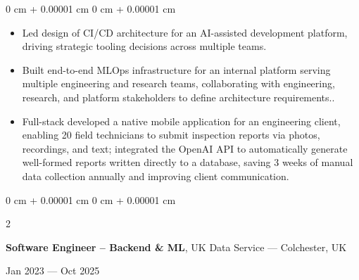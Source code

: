 \documentclass[6pt, letterpaper]{article}
\newenvironment{highlights}{
    \begin{itemize}[
        topsep=0.03 cm,
        parsep=0.03 cm,
        partopsep=0pt,
        itemsep=0pt,
        leftmargin=0 cm + 10pt
    ]
}{
    \end{itemize}
} %
\newenvironment{onecolentry}{
    \begin{adjustwidth}{
        0 cm + 0.00001 cm
    }{
        0 cm + 0.00001 cm
    }
}{
    \end{adjustwidth}
} %
\newenvironment{twocolentry}[2][]{
    \onecolentry
    \def\secondColumn{#2}
    \setcolumnwidth{\fill, 4.5 cm}
    \begin{paracol}{2}
}{
    \switchcolumn \raggedleft \secondColumn
    \end{paracol}
    \endonecolentry
} %
\begin{document}
        \begin{onecolentry}
        \begin{highlights}

            \item Led design of CI/CD architecture for an AI-assisted development platform, driving strategic tooling decisions across multiple teams.
            \item Built end-to-end MLOps infrastructure for an internal platform serving multiple engineering and research teams, collaborating with engineering, research, and platform stakeholders to define architecture requirements..
            \item Full-stack developed a native mobile application for an engineering client, enabling 20 field technicians to submit inspection reports via photos, recordings, and text; integrated the OpenAI API to automatically generate well-formed reports written directly to a database, saving 3 weeks of manual data collection annually and improving client communication.

        \end{highlights}
        \end{onecolentry}

        \begin{twocolentry}{Jan 2023 --- Oct 2025}
            \textbf{Software Engineer – Backend \& ML}, UK Data Service --- Colchester, UK
        \end{twocolentry}
\end{document}
